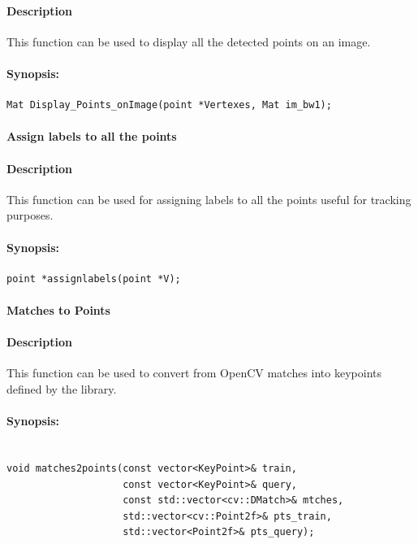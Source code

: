 \paragraph{Description}
 This function can be used to display all the detected points on an image.
\paragraph{Synopsis:}
\begin{lstlisting}
Mat Display_Points_onImage(point *Vertexes, Mat im_bw1);
\end{lstlisting}


\paragraph{Assign labels to all the points}
\paragraph{Description}
This function can be used for assigning labels to all the points useful for tracking purposes. 
\paragraph{Synopsis:}
\begin{lstlisting}
point *assignlabels(point *V);
\end{lstlisting}




\paragraph{Matches to Points}
\paragraph{Description}
 This function can be used to convert from OpenCV matches into keypoints defined by the library. 
\paragraph{Synopsis:}
\begin{lstlisting}

void matches2points(const vector<KeyPoint>& train, 
         			const vector<KeyPoint>& query,
           			const std::vector<cv::DMatch>& mtches, 
           			std::vector<cv::Point2f>& pts_train,
           			std::vector<Point2f>& pts_query);

\end{lstlisting}
